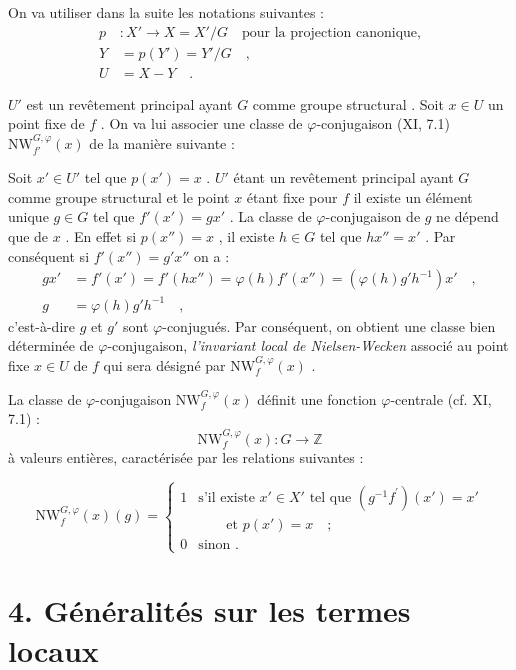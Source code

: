 \documentclass[11pt]{article}
\providecommand{\bZ}{\mathbb Z}
\begin{document}
On va utiliser dans la suite les notations suivantes :
\begin{align*}
p &: X' \longrightarrow X = X'/G \quad \text{pour la projection canonique,} \\
Y &= p(Y') = Y'/G \quad , \\
U &= X - Y \quad .
\end{align*}

$U'$ est un revêtement principal ayant $G$ comme groupe structural . Soit $x \in U$ un point fixe de $f$ . On va lui associer une classe de $\varphi$-conjugaison (XI, 7.1) $\mathrm{NW}_{f'}^{G,\varphi}(x)$ de la manière suivante :

Soit $x' \in U'$ tel que $p(x') = x$ . $U'$ étant un revêtement principal ayant $G$ comme groupe structural et le point $x$ étant fixe pour $f$ il existe un élément unique $g \in G$ tel que $f'(x') = gx'$ . La classe de $\varphi$-conjugaison de $g$ ne dépend que de $x$ . En effet si $p(x'') = x$ , il existe $h \in G$ tel que $hx'' = x'$ . Par conséquent si $f'(x'') = g'x''$ on a :
\begin{align*}
gx' &= f'(x') = f'(hx'') = \varphi(h)f'(x'') = (\varphi(h)g'h^{-1})x' \quad , \\
g &= \varphi(h)g'h^{-1} \quad ,
\end{align*}
c'est-à-dire $g$ et $g'$ sont $\varphi$-conjugués. Par conséquent, on obtient une classe bien déterminée de $\varphi$-conjugaison, \emph{l'invariant local de Nielsen-Wecken} associé au point fixe $x \in U$ de $f$ qui sera désigné par $\mathrm{NW}_{f}^{G,\varphi}(x)$ .

La classe de $\varphi$-conjugaison $\mathrm{NW}_{f}^{G,\varphi}(x)$ définit une fonction $\varphi$-centrale (cf. XI, 7.1) :
\[
\mathrm{NW}_{f}^{G,\varphi}(x) : G \longrightarrow \bZ
\]
à valeurs entières, caractérisée par les relations suivantes :

\begin{equation}\tag{3.1}
\mathrm{NW}_{f}^{G,\varphi}(x)(g) = \begin{cases} 1 & \text{s'il existe } x' \in X' \text{ tel que } (g^{-1}f^{\prime})(x') = x' \\ & \qquad \text{et } p(x') = x \quad ; \\ 0 & \text{sinon .} \end{cases}
\end{equation}

\section*{4. Généralités sur les termes locaux}
\end{document}
